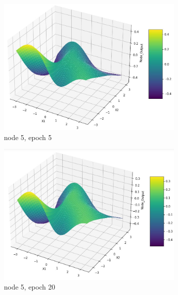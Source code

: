 \documentclass[11pt]{article}
\begin{document}
\begin{figure}[h!]
\begin{subfigure}[b]{0.3\textwidth}
	\includegraphics[scale=0.14]{hidden2_n5_e5.jpg}
	\caption{node 5, epoch 5}
	\label{fig:fig2.1.7.7}
	\end{subfigure}
	\begin{subfigure}[b]{0.3\textwidth}
	\centering
	\includegraphics[scale=0.14]{hidden2_n5_e20.jpg}
	\caption{node 5, epoch 20}
	\label{fig:fig2.1.7.8}
	\end{subfigure}
	\begin{subfigure}[b]{0.45\textwidth}
	\centering

\end{subfigure}
\end{figure}
\end{document}
